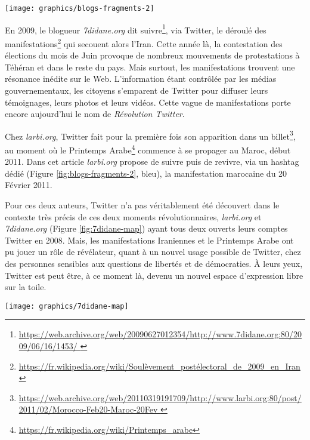 \documentclass[symmetric,justified,marginals=raggedouter]{tufte-book}
\begin{document}
\begin{figure*}
  \texttt{[image: graphics/blogs-fragments-2]}
  \caption{Premiers fragments Web archivés faisant mention de Twitter chez \textit{larbi.org} \textit{7didane.org}}
  \label{fig:blogs-fragments-2}
\end{figure*}

\noindent En 2009, le blogueur \textit{7didane.org} dit suivre\footnote{\url{https://web.archive.org/web/20090627012354/http://www.7didane.org:80/2009/06/16/1453/
}}, via Twitter, le déroulé des manifestations\footnote{\url{https://fr.wikipedia.org/wiki/Soulèvement\_postélectoral\_de\_2009\_en\_Iran}} qui secouent alors l'Iran. Cette année là, la contestation des élections du mois de Juin provoque de nombreux mouvements de protestations à Téhéran et dans le reste du pays. Mais surtout, les manifestations trouvent une résonance inédite sur le Web. L'information étant contrôlée par les médias gouvernementaux, les ci\-toyens s'emparent de Twitter pour diffuser leurs témoignages, leurs photos et leurs vidéos. Cette vague de manifestations porte encore aujourd'hui le nom de \textit{Révolution Twitter}. 

Chez \textit{larbi.org}, Twitter fait pour la première fois son apparition dans un billet\footnote{\url{https://web.archive.org/web/20110319191709/http://www.larbi.org:80/post/2011/02/Morocco-Feb20-Maroc-20Fev
}}, au moment où le Printemps Arabe\footnote{\url{https://fr.wikipedia.org/wiki/Printemps_arabe}} commence à se pro\-pager au Maroc, début 2011. Dans cet article \textit{larbi.org} propose de suivre puis de revivre, via un hashtag dédié (Figure \ref{fig:blogs-fragments-2}, bleu), la manifestation marocaine du 20 Février 2011.

Pour ces deux auteurs, Twitter n'a pas véritablement été découvert dans le contexte très précis de ces deux moments révolutionnaires, \textit{larbi.org} et \textit{7didane.org} (Figure \ref{fig:7didane-map}) ayant tous deux ouverts leurs comptes Twitter en 2008. Mais, les manifestations Iraniennes et le Printemps Arabe ont pu jouer un rôle de révélateur, quant à un nouvel usage possible de Twitter, chez des personnes sensibles aux questions de libertés et de démocraties. À leurs yeux, Twitter est peut être, à ce moment là, devenu un nouvel espace d'expression libre sur la toile. 

\begin{marginfigure}%
  \texttt{[image: graphics/7didane-map]}
  \vspace*{0.2cm}  
  \caption{\textit{7didane.org} (rouge) dans l'e-Diaspora marocaine}
  \label{fig:7didane-map}
\end{marginfigure} 
\end{document}
